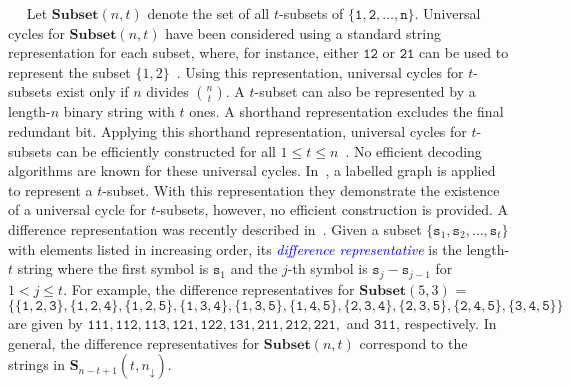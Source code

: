 \documentclass[US-letter,USenglish,authorcolumns,autoref]{lipics-v2021}
\renewcommand{\tt} {\mathtt}
\newcommand{\bS}{\mathbf{S}}
\newcommand{\defo}[1] {\emph{\textcolor{blue}{#1}}}
\begin{document}
\medskip
~~
%
Let $\mathbf{Subset}(n,t)$ denote the set of all $t$-subsets of $\{\tt{1,2,\ldots, n}\}$.
Universal cycles for $\mathbf{Subset}(n,t)$  have been considered using a standard string representation for each subset, where, for instance, either $\tt{12}$ or $\tt{21}$ can be used to represent the subset $\{1,2\}$~\cite{chung,jackson,hurlbert,2009research,rudoy}.  Using this representation, universal cycles for $t$-subsets exist only if $n$ divides ${n \choose t}$.  A $t$-subset can also be represented by a length-$n$ binary string with $t$ ones. A shorthand representation excludes the final redundant bit. Applying this shorthand representation, universal cycles for $t$-subsets can be efficiently constructed for all $1 \leq t \leq n$~\cite{fixedweight2}. No efficient decoding algorithms are known for these universal cycles.  
In~\cite{cantwell}, a labelled graph is applied to represent a $t$-subset. With this representation they demonstrate the existence of a universal cycle for $t$-subsets, however, no efficient construction is provided.
A difference representation was recently described in~\cite{difference}.  Given a subset
$\{\tt{s}_1, \tt{s}_2, \ldots , \tt{s}_t\}$ with elements listed in increasing order, its \defo{difference representative} is the length-$t$ string where the first symbol is $\tt{s}_1$ and the $j$-th symbol is  $\tt{s}_j - \tt{s}_{j-1}$ for $1 < j \leq t$. For example, the difference representatives for 
 $\mathbf{Subset}(5,3)$ = \[ \{ \tt{\{1,2,3\}, \{1,2,4\}, \{1,2,5\}, \{1,3,4\}, \{1,3,5\}, \{1,4,5\}, \{2,3,4\}, \{2,3,5\}, \{2,4,5\}, \{3,4,5\}} \}\] 
 are given by
$\tt{111, 112, 113, 121, 122, 131, 211, 212, 221},$ and $\tt{311}$, respectively.  In general, the difference representatives for $\mathbf{Subset}(n,t)$ correspond to the strings in $\bS_{n-t+1}(t,n_\downarrow)$.
\end{document}
